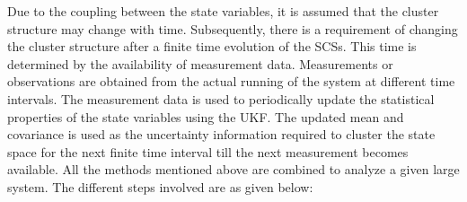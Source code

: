 Due to the coupling between the state variables, it is assumed that the cluster structure may change with time. Subsequently, there is a requirement of changing the cluster structure after a finite time evolution of the SCSs. This time is determined by the availability of measurement data. Measurements or observations are obtained from the actual running of the system at different time intervals. The measurement data is used to periodically update the statistical properties of the state variables using the UKF. The updated mean and covariance is used as the uncertainty information required to cluster the state space for the next finite time interval till the next measurement becomes available. All the methods mentioned above are combined to analyze a given large system. The different steps involved are as given below:

